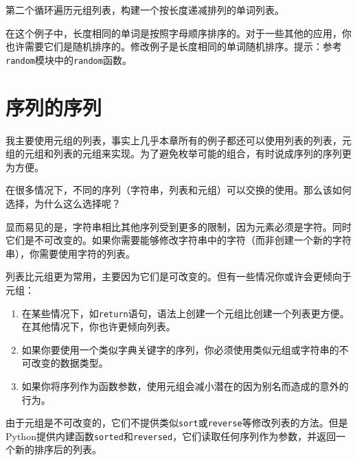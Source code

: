 
第二个循环遍历元组列表，构建一个按长度递减排列的单词列表。

\begin{ex}
在这个例子中，长度相同的单词是按照字母顺序排序的。对于一些其他的应用，你也许需要它们是随机排序的。修改例子是长度相同的单词随机排序。提示：参考{\tt random}模块中的{\tt random}函数。



\end{ex}


\section{序列的序列}

我主要使用元组的列表，事实上几乎本章所有的例子都还可以使用列表的列表，元组的元组和列表的元组来实现。为了避免枚举可能的组合，有时说成序列的序列更为方便。

在很多情况下，不同的序列（字符串，列表和元组）可以交换的使用。那么该如何选择，为什么这么选择呢？


显而易见的是，字符串相比其他序列受到更多的限制，因为元素必须是字符。同时它们是不可改变的。如果你需要能够修改字符串中的字符（而非创建一个新的字符串），你需要使用字符的列表。

列表比元组更为常用，主要因为它们是可改变的。但有一些情况你或许会更倾向于元组：

\begin{enumerate}

\item 在某些情况下，如{\tt return}语句，语法上创建一个元组比创建一个列表更方便。在其他情况下，你也许更倾向列表。

\item 如果你要使用一个类似字典关键字的序列，你必须使用类似元组或字符串的不可改变的数据类型。

\item 如果你将序列作为函数参数，使用元组会减小潜在的因为别名而造成的意外的行为。

\end{enumerate}

由于元组是不可改变的，它们不提供类似{\tt sort}或{\tt reverse}等修改列表的方法。但是Python提供内建函数{\tt sorted}和{\tt reversed}，它们读取任何序列作为参数，并返回一个新的排序后的列表。

